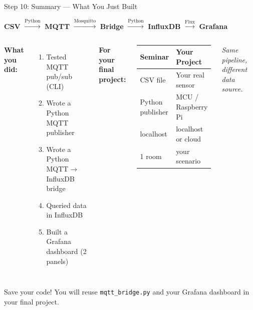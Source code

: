 \documentclass[aspectratio=169,11pt]{beamer}
\begin{document}
\begin{frame}{Step 10: Summary --- What You Just Built}
    \begin{center}
    \large
    \textbf{CSV} $\xrightarrow{\text{Python}}$ \textbf{MQTT} $\xrightarrow{\text{Mosquitto}}$ \textbf{Bridge} $\xrightarrow{\text{Python}}$ \textbf{InfluxDB} $\xrightarrow{\text{Flux}}$ \textbf{Grafana}
    \end{center}

    \vspace{0.3cm}
    \begin{columns}
        \textbf{What you did:}
        \begin{enumerate}
            \item Tested MQTT pub/sub (CLI)
            \item Wrote a Python MQTT publisher
            \item Wrote a Python MQTT$\rightarrow$InfluxDB bridge
            \item Queried data in InfluxDB
            \item Built a Grafana dashboard (2 panels)
        \end{enumerate}

        \textbf{For your final project:}

        \vspace{0.2cm}
        \begin{center}
        \footnotesize
        \begin{tabular}{ll}
            \toprule
            \textbf{Seminar} & \textbf{Your Project} \\
            \midrule
            CSV file & Your real sensor \\
            Python publisher & MCU / Raspberry Pi \\
            localhost & localhost or cloud \\
            1 room & your scenario \\
            \bottomrule
        \end{tabular}
        \normalsize
        \end{center}

        \vspace{0.2cm}
        \textit{Same pipeline, different data source.}
    \end{columns}

    \vspace{0.3cm}
    \begin{alertblock}{Save your code!}
        You will reuse \texttt{mqtt\_bridge.py} and your Grafana dashboard in your final project.
    \end{alertblock}
\end{frame}
\end{document}
